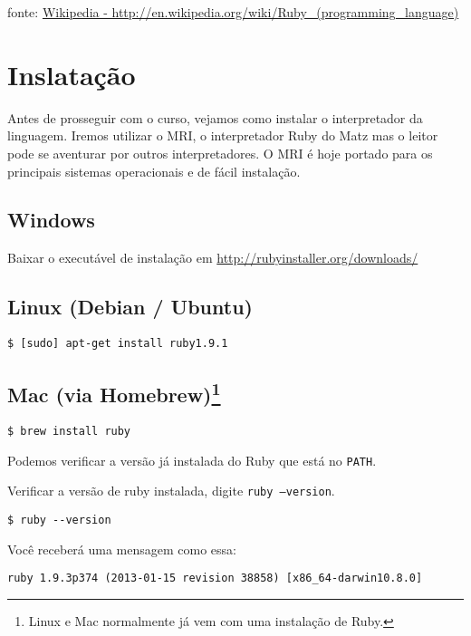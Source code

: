 \documentclass[serif,mathserif]{book}
\newcommand*{\Package}[1]{\texttt{#1}}%
\begin{document}
fonte: \href{http://en.wikipedia.org/wiki/Ruby_(programming_language)}{Wikipedia - http://en.wikipedia.org/wiki/Ruby_(programming_language)}

\section{Inslatação}
Antes de prosseguir com o curso, vejamos como instalar o interpretador da linguagem. Iremos utilizar o MRI, o interpretador
Ruby do Matz mas o leitor pode se aventurar por outros interpretadores. O MRI é hoje portado para os 
principais sistemas operacionais e de fácil instalação.

\subsection{Windows}

Baixar o executável de instalação em \url{http://rubyinstaller.org/downloads/}

\subsection{Linux (Debian / Ubuntu)}

\begin{lstlisting}[style=BashInputStyle]
$ [sudo] apt-get install ruby1.9.1
\end{lstlisting}

\subsection{Mac (via Homebrew)\footnote{Linux e Mac normalmente já vem com uma instalação de Ruby.}}

\begin{lstlisting}[style=BashInputStyle]
$ brew install ruby
\end{lstlisting}

Podemos verificar a versão já instalada do Ruby que está no \Package{PATH}.

Verificar a versão de ruby instalada, digite  \Package{ruby --version}.

\begin{lstlisting}[style=BashInputStyle]
$ ruby --version
\end{lstlisting}

Você receberá uma mensagem como essa:
\begin{lstlisting}[style=BashOutputStyle]
ruby 1.9.3p374 (2013-01-15 revision 38858) [x86_64-darwin10.8.0]
\end{lstlisting}
\end{document}
